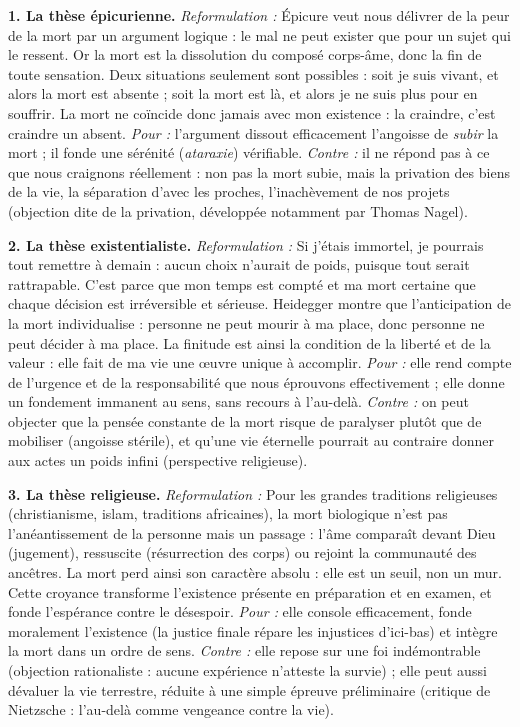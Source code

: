 \documentclass[11pt]{article}
\begin{document}
\begin{corrige}
\textbf{1. La thèse épicurienne.} \emph{Reformulation :} Épicure veut nous délivrer de la peur de la mort par un argument logique : le mal ne peut exister que pour un sujet qui le ressent. Or la mort est la dissolution du composé corps-âme, donc la fin de toute sensation. Deux situations seulement sont possibles : soit je suis vivant, et alors la mort est absente ; soit la mort est là, et alors je ne suis plus pour en souffrir. La mort ne coïncide donc jamais avec mon existence : la craindre, c'est craindre un absent. \emph{Pour :} l'argument dissout efficacement l'angoisse de \emph{subir} la mort ; il fonde une sérénité (\emph{ataraxie}) vérifiable. \emph{Contre :} il ne répond pas à ce que nous craignons réellement : non pas la mort subie, mais la privation des biens de la vie, la séparation d'avec les proches, l'inachèvement de nos projets (objection dite de la privation, développée notamment par Thomas Nagel).

\textbf{2. La thèse existentialiste.} \emph{Reformulation :} Si j'étais immortel, je pourrais tout remettre à demain : aucun choix n'aurait de poids, puisque tout serait rattrapable. C'est parce que mon temps est compté et ma mort certaine que chaque décision est irréversible et sérieuse. Heidegger montre que l'anticipation de la mort individualise : personne ne peut mourir à ma place, donc personne ne peut décider à ma place. La finitude est ainsi la condition de la liberté et de la valeur : elle fait de ma vie une œuvre unique à accomplir. \emph{Pour :} elle rend compte de l'urgence et de la responsabilité que nous éprouvons effectivement ; elle donne un fondement immanent au sens, sans recours à l'au-delà. \emph{Contre :} on peut objecter que la pensée constante de la mort risque de paralyser plutôt que de mobiliser (angoisse stérile), et qu'une vie éternelle pourrait au contraire donner aux actes un poids infini (perspective religieuse).

\textbf{3. La thèse religieuse.} \emph{Reformulation :} Pour les grandes traditions religieuses (christianisme, islam, traditions africaines), la mort biologique n'est pas l'anéantissement de la personne mais un passage : l'âme comparaît devant Dieu (jugement), ressuscite (résurrection des corps) ou rejoint la communauté des ancêtres. La mort perd ainsi son caractère absolu : elle est un seuil, non un mur. Cette croyance transforme l'existence présente en préparation et en examen, et fonde l'espérance contre le désespoir. \emph{Pour :} elle console efficacement, fonde moralement l'existence (la justice finale répare les injustices d'ici-bas) et intègre la mort dans un ordre de sens. \emph{Contre :} elle repose sur une foi indémontrable (objection rationaliste : aucune expérience n'atteste la survie) ; elle peut aussi dévaluer la vie terrestre, réduite à une simple épreuve préliminaire (critique de Nietzsche : l'au-delà comme vengeance contre la vie).
\end{corrige}
\end{document}
